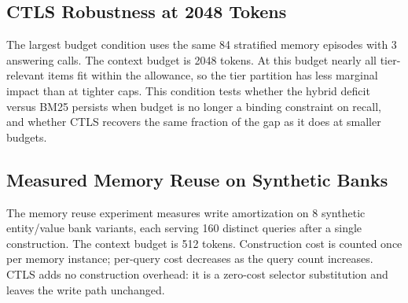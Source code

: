 \subsection{CTLS Robustness at 2048 Tokens}

\label{sec:setup_protocol_replication}

The largest budget condition uses the same 84 stratified memory episodes with 3 answering calls. The context budget is 2048 tokens. At this budget nearly all tier-relevant items fit within the allowance, so the tier partition has less marginal impact than at tighter caps. This condition tests whether the hybrid deficit versus BM25 persists when budget is no longer a binding constraint on recall, and whether CTLS recovers the same fraction of the gap as it does at smaller budgets.

\subsection{Measured Memory Reuse on Synthetic Banks}

\label{sec:setup_memory_reuse}

The memory reuse experiment measures write amortization on 8 synthetic entity/value bank variants, each serving 160 distinct queries after a single construction. The context budget is 512 tokens. Construction cost is counted once per memory instance; per-query cost decreases as the query count increases. CTLS adds no construction overhead: it is a zero-cost selector substitution and leaves the write path unchanged.
